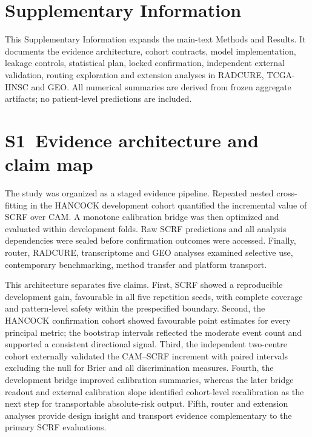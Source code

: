 \documentclass[pdflatex,sn-nature]{sn-jnl}
\renewcommand{\arraystretch}{1.20}
\begin{document}
\section*{Supplementary Information}

This Supplementary Information expands the main-text Methods and Results. It documents the evidence architecture, cohort contracts, model implementation, leakage controls, statistical plan, locked confirmation, independent external validation, routing exploration and extension analyses in RADCURE, TCGA-HNSC and GEO. All numerical summaries are derived from frozen aggregate artifacts; no patient-level predictions are included.

\setcounter{figure}{0}
\setcounter{table}{0}
\renewcommand{\thefigure}{S\arabic{figure}}
\renewcommand{\thetable}{S\arabic{table}}
\renewcommand{\theHfigure}{supp.figure.\arabic{figure}}
\renewcommand{\theHtable}{supp.table.\arabic{table}}
\setlength{\LTcapwidth}{\textwidth}
\renewcommand{\arraystretch}{1.22}

\section*{S1~Evidence architecture and claim map}
The study was organized as a staged evidence pipeline. Repeated nested cross-fitting in the HANCOCK development cohort quantified the incremental value of SCRF over CAM. A monotone calibration bridge was then optimized and evaluated within development folds. Raw SCRF predictions and all analysis dependencies were sealed before confirmation outcomes were accessed. Finally, router, RADCURE, transcriptome and GEO analyses examined selective use, contemporary benchmarking, method transfer and platform transport.

This architecture separates five claims. First, SCRF showed a reproducible development gain, favourable in all five repetition seeds, with complete coverage and pattern-level safety within the prespecified boundary. Second, the HANCOCK confirmation cohort showed favourable point estimates for every principal metric; the bootstrap intervals reflected the moderate event count and supported a consistent directional signal. Third, the independent two-centre cohort externally validated the CAM--SCRF increment with paired intervals excluding the null for Brier and all discrimination measures. Fourth, the development bridge improved calibration summaries, whereas the later bridge readout and external calibration slope identified cohort-level recalibration as the next step for transportable absolute-risk output. Fifth, router and extension analyses provide design insight and transport evidence complementary to the primary SCRF evaluations.
\end{document}

